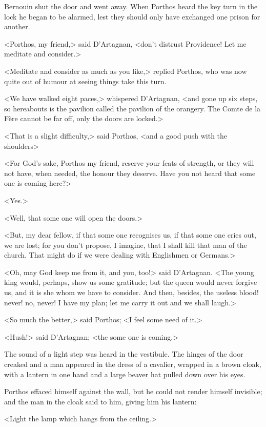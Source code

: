 Bernouin shut the door and went away. When Porthos heard the key turn in the lock he began to be alarmed, lest they should only have exchanged one prison for another.

<Porthos, my friend,> said D'Artagnan, <don't distrust Providence! Let me meditate and consider.>

<Meditate and consider as much as you like,> replied Porthos, who was now quite out of humour at seeing things take this turn.

<We have walked eight paces,> whispered D'Artagnan, <and gone up six steps, so hereabouts is the pavilion called the pavilion of the orangery. The Comte de la Fère cannot be far off, only the doors are locked.>

<That is a slight difficulty,> said Porthos, <and a good push with the shoulders\longdash>

<For God's sake, Porthos my friend, reserve your feats of strength, or they will not have, when needed, the honour they deserve. Have you not heard that some one is coming here?>

<Yes.>

<Well, that some one will open the doors.>

<But, my dear fellow, if that some one recognises us, if that some one cries out, we are lost; for you don't propose, I imagine, that I shall kill that man of the church. That might do if we were dealing with Englishmen or Germans.>

<Oh, may God keep me from it, and you, too!> said D'Artagnan. <The young king would, perhaps, show us some gratitude; but the queen would never forgive us, and it is she whom we have to consider. And then, besides, the useless blood! never! no, never! I have my plan; let me carry it out and we shall laugh.>

<So much the better,> said Porthos; <I feel some need of it.>

<Hush!> said D'Artagnan; <the some one is coming.>

The sound of a light step was heard in the vestibule. The hinges of the door creaked and a man appeared in the dress of a cavalier, wrapped in a brown cloak, with a lantern in one hand and a large beaver hat pulled down over his eyes.

Porthos effaced himself against the wall, but he could not render himself invisible; and the man in the cloak said to him, giving him his lantern:

<Light the lamp which hangs from the ceiling.>

